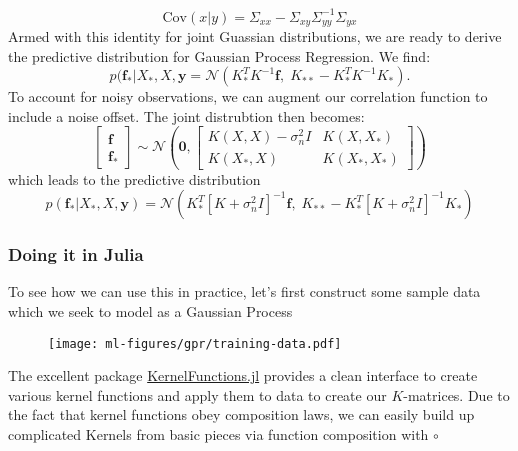 \begin{equation}
\boxed{\text{Cov}(x \vert y) = \Sigma_{xx} - \Sigma_{xy}\Sigma_{yy}^{-1}\Sigma_{yx}}
\end{equation}
Armed with this identity for joint Guassian distributions, we are ready to derive the predictive distribution for Gaussian Process Regression. We find:
\begin{equation}
  p(\mathbf{f}_* \vert X_*, X, \mathbf{y} = \mathcal{N}\left( K_*^TK^{-1}\mathbf{f},\; K_{**}-K_*^TK^{-1}K_*\right).
\end{equation}
To account for noisy observations, we can augment our correlation function to include a noise offset. The joint distrubtion then becomes:
\begin{equation}
  \begin{bmatrix} \mathbf{f} \\ \mathbf{f}_* \end{bmatrix} \sim \mathcal{N}\left(\mathbf{0},\begin{bmatrix} K(X,X)-\sigma_n^2I & K(X,X_*) \\ K(X_*,X) & K(X_*,X_*) \end{bmatrix}\right)
\end{equation}
which leads to the predictive distribution
\begin{equation}
  \boxed{p(\mathbf{f}_* \vert X_*, X, \mathbf{y}) = \mathcal{N}\left( K_*^T\left[K + \sigma_n^2 I\right]^{-1}\mathbf{f},\; K_{**}-K_*^T\left[K + \sigma_n^2 I\right]^{-1}K_*\right)}
\end{equation}


\subsubsection{Doing it in Julia}

To see how we can use this in practice, let's first construct some sample data which we seek to model as a Gaussian Process
\begin{figure}[h]
  \begin{centering}
    \texttt{[image: ml-figures/gpr/training-data.pdf]}
  \end{centering}
\end{figure}

The excellent package \href{https://juliagaussianprocesses.github.io/KernelFunctions.jl/dev/userguide/}{KernelFunctions.jl} provides a clean interface to create various kernel functions and apply them to data to create our $K$-matrices. Due to the fact that kernel functions obey composition laws, we can easily build up complicated Kernels from basic pieces via function composition with $\circ$

